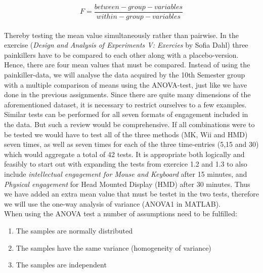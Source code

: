 \[F=\frac{between-group-variables}{within-group-variables}\]
\\
Thereby testing the mean value simultaneously rather than pairwise.
In the exercise (\textit{Design and Analysis of Experiments V: Exercies} by Sofia Dahl) three painkillers have to be compared to each other along with a placebo-version. Hence, there are four mean values that must be compared.  Instead of using the painkiller-data, we will analyse the data acquired by the 10th Semester group with a multiple comparison of means using the ANOVA-test, just like we have done in the previous assignments.
Since there are quite many dimensions of the aforementioned dataset, it is necessary to restrict ourselves to a few examples. Similar tests can be performed for all seven formats of engagement included in the data. But such a review would be comprehensive. If all combinations were to be tested we would have to test all of the three methods (MK, Wii and HMD) seven times, as well as seven times for each of the three time-entries (5,15 and 30) which would aggregate a total of 42 tests.
It is appropriate both logically and feasibly to start out with expanding the tests from exercice 1.2 and 1.3 to also include \textit{intellectual engagement for Mouse and Keyboard} after 15 minutes, and \textit{Physical engagement} for Head Mounted Display (HMD) after 30 minutes. Thus we have added an extra mean value that must be testet in the two tests, therefore we will use the one-way analysis of variance (ANOVA1 in MATLAB).\\

When using the ANOVA test a number of assumptions need to be fulfilled:
\begin{enumerate}
\item{The samples are normally distributed}
\item{The samples have the same variance (homogeneity of variance)}
\item{The samples are independent}
\end{enumerate}

